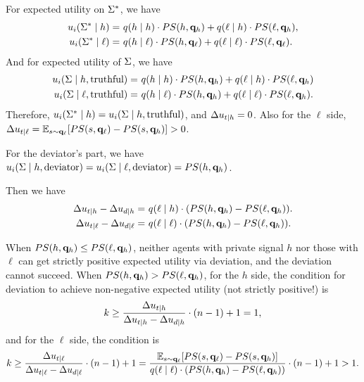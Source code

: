     For expected utility on $\Sigma^*$, we have
\begin{align*}
    u_i(\Sigma^* \mid h) = &\ q(h \mid h) \cdot PS(h, \mathbf{q}_h) + q(\ell \mid h) \cdot PS(\ell, \mathbf{q}_h),\\
    u_i(\Sigma^* \mid \ell) = &\ q(h \mid \ell) \cdot PS(h, \mathbf{q}_\ell) + q(\ell \mid \ell) \cdot PS(\ell, \mathbf{q}_\ell). 
\end{align*}
    And for expected utility of $\Sigma$, we have 
\begin{align*}
    u_i(\Sigma\mid h, \text{truthful}) = &\ q(h \mid h) \cdot PS(h, \mathbf{q}_h) + q(\ell \mid h) \cdot PS(\ell, \mathbf{q}_h)\\
     u_i(\Sigma\mid \ell, \text{truthful}) =&\ q(h \mid \ell) \cdot PS(h, \mathbf{q}_h) + q(\ell \mid \ell) \cdot PS(\ell, \mathbf{q}_h). 
\end{align*}
Therefore, $u_i(\Sigma^* \mid h) = u_i(\Sigma\mid h, \text{truthful})$, and $\Delta u_{t\mid h} = 0$. Also for the $\ell$ side, $\Delta u_{t\mid \ell} = \mathbb{E}_{s\sim \mathbf{q}_{\ell}}[PS(s, \mathbf{q}_{\ell}) - PS(s, \mathbf{q}_{h})] > 0$. 

For the deviator's part, we have $u_i(\Sigma\mid h, \text{deviator}) = u_i(\Sigma\mid \ell, \text{deviator}) = PS(h, \mathbf{q}_h)$. 

Then we have 
\begin{align*}
    \Delta u_{t\mid h} - \Delta u_{d\mid h} =&\ q(\ell \mid h) \cdot (PS(h, \mathbf{q}_h) - PS(\ell, \mathbf{q}_h)).\\
    \Delta u_{t\mid \ell} - \Delta u_{d\mid \ell} =&\ q(\ell \mid \ell) \cdot (PS(h, \mathbf{q}_h) - PS(\ell, \mathbf{q}_h)).
\end{align*}

When $PS(h, \mathbf{q}_h) \le  PS(\ell, \mathbf{q}_h)$, neither agents with private signal $h$ nor those with $\ell$ can get strictly positive expected utility via deviation, and the deviation cannot succeed. When $PS(h, \mathbf{q}_h) >  PS(\ell, \mathbf{q}_h)$, for the $h$ side, the condition for deviation to achieve non-negative expected utility (not strictly positive!) is
\begin{equation*}
    k \ge \frac{\Delta u_{t\mid h}}{\Delta u_{t\mid h} - \Delta u_{d\mid h}}\cdot (n-1) + 1 = 1,
\end{equation*}
and for the $\ell$ side, the condition is
\begin{equation*}
    k \ge \frac{\Delta u_{t\mid \ell}}{\Delta u_{t\mid \ell} - \Delta u_{d\mid \ell}}\cdot (n-1) + 1 = \frac{\mathbb{E}_{s\sim \mathbf{q}_{\ell}}[PS(s, \mathbf{q}_{\ell}) - PS(s, \mathbf{q}_{h})]}{ q(\ell \mid \ell) \cdot (PS(h, \mathbf{q}_h) - PS(\ell, \mathbf{q}_h))}\cdot (n-1) + 1 > 1.
\end{equation*}

